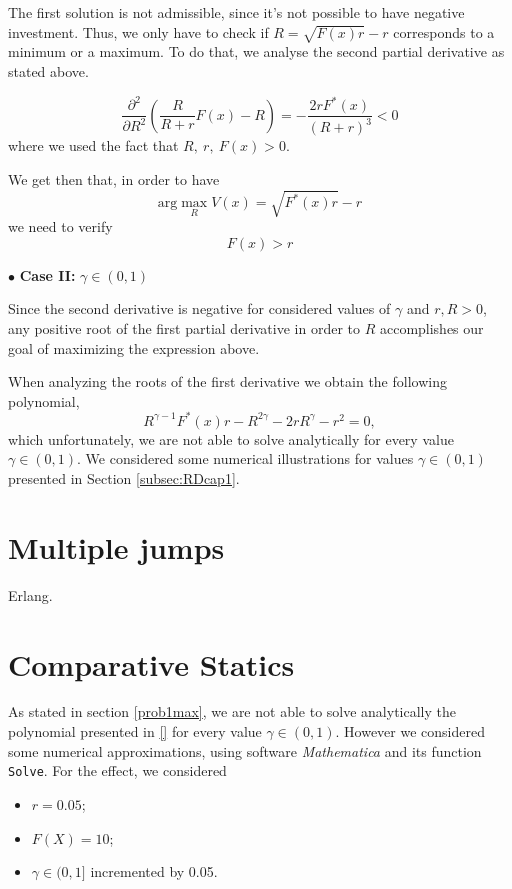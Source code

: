 The first solution is not admissible, since it's not possible to have negative investment. Thus, we only have to check if $R=\sqrt{F(x)r}-r$ corresponds to a minimum or a maximum. To do that, we analyse the second partial derivative as stated above.

$$\frac{\partial^2}{\partial R^2} \left( \frac{R}{R+r} F(x) -R \right) 
= -\frac{2rF^*(x)}{(R+r)^3}<0$$
where we used the fact that $R,\ r, \ F(x)>0$.

We get then that, in order to have
$$ \text{arg} \max_R V(x)= \sqrt{F^*(x)r}-r $$
we need to verify
\begin{equation}
F(x)>r
\label{ass3}
\end{equation}

$\bullet$ \textbf{Case II:} $\gamma \in (0,1) $


Since the second derivative is negative for considered values of $\gamma$ and $r,R>0$, any positive root of the first partial derivative in order to $R$ accomplishes our goal of maximizing the expression above.

When analyzing the roots of the first derivative we obtain the following polynomial, 
$$
R^{\gamma-1}F^*(x)r-R^{2\gamma}-2rR^\gamma-r^2=0,$$
which unfortunately, we are not able to solve analytically for every value $\gamma \in (0,1) $. We considered some numerical illustrations for values $\gamma \in (0,1)$ presented in Section \ref{subsec:RDcap1}.


\section{Multiple jumps}
\label{section:max_jumps}

Erlang.


\section{Comparative Statics}

As stated in section \ref{prob1max}, we are not able to solve analytically the polynomial presented in \eqref{} for every value $\gamma \in (0,1)$. However we considered some numerical approximations, using software \textit{Mathematica} and its function \texttt{Solve}. For the effect, we considered 
\begin{itemize}
	\item $r=0.05$;
	\item $F(X)=10$;
	\item $\gamma \in (0,1]$ incremented by 0.05.
\end{itemize}

